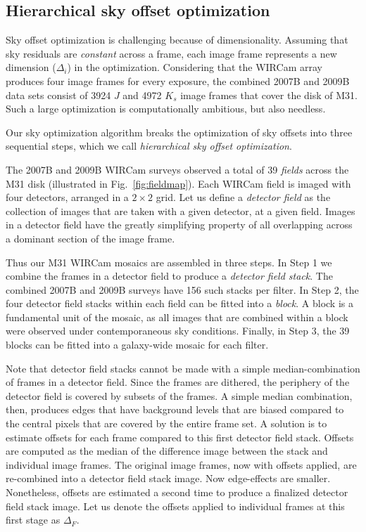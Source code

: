 \documentclass[iop]{emulateapj}
\newcommand{\Fig}[1]{Fig.~\ref{fig:#1}}  %
\begin{document}
\subsection{Hierarchical sky offset optimization}
\label{sec:hierarchical_algo}

Sky offset optimization is challenging because of dimensionality. Assuming that sky residuals are \emph{constant} across a frame, each image frame represents a new dimension ($\Delta_i$) in the optimization. Considering that the WIRCam array produces four image frames for every exposure, the combined 2007B and 2009B data sets consist of 3924 $J$ and 4972 $K_s$ image frames that cover the disk of M31. Such a large optimization is computationally ambitious, but also needless.

Our sky optimization algorithm breaks the optimization of sky offsets into three sequential steps, which we call \emph{hierarchical sky offset optimization}.

The 2007B and 2009B WIRCam surveys observed a total of 39 \emph{fields} across the M31 disk (illustrated in \Fig{fieldmap}).
Each WIRCam field is imaged with four detectors, arranged in a $2\times 2$ grid.
Let us define a \emph{detector field} as the collection of images that are taken with a given detector, at a given field.
Images in a detector field have the greatly simplifying property of all overlapping across a dominant section of the image frame.

Thus our M31 WIRCam mosaics are assembled in three steps.
In Step 1 we combine the frames in a detector field to produce a \emph{detector field stack}.
The combined 2007B and 2009B surveys have 156 such stacks per filter.
In Step 2, the four detector field stacks within each field can be fitted into a \emph{block}.
A block is a fundamental unit of the mosaic, as all images that are combined within a block were observed under contemporaneous sky conditions.
Finally, in Step 3, the 39 blocks can be fitted into a galaxy-wide mosaic for each filter.

Note that detector field stacks cannot be made with a simple median-combination of frames in a detector field.
Since the frames are dithered, the periphery of the detector field is covered by subsets of the frames.
A simple median combination, then, produces edges that have background levels that are biased compared to the central pixels that are covered by the entire frame set.
A solution is to estimate offsets for each frame compared to this first detector field stack.
Offsets are computed as the median of the difference image between the stack and individual image frames.
The original image frames, now with offsets applied, are re-combined into a detector field stack image.
Now edge-effects are smaller.
Nonetheless, offsets are estimated a second time to produce a finalized detector field stack image.
Let us denote the offsets applied to individual frames at this first stage as $\Delta_F$.
\end{document}
